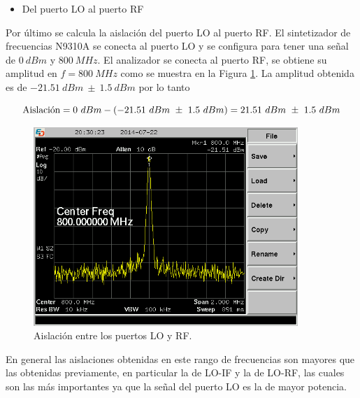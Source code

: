 \documentclass[a4paper,10pt]{article}
\begin{document}
	\begin{itemize}
		\item Del puerto LO al puerto RF
	\end{itemize}
	
	\indent Por \'ultimo se calcula la aislaci\'on del puerto LO al puerto RF. El sintetizador de frecuencias N9310A se conecta al puerto LO y se configura para tener una se\~nal de $0~dBm$ y $800~MHz$. El analizador se conecta al puerto RF, se obtiene su amplitud en $f=800~MHz$ como se muestra en la Figura \ref{isolation3fran}. La amplitud obtenida es de $-21.51~dBm~\pm~1.5~dBm$ por lo tanto
			
		$$\textmd{Aislaci\'on}=0~dBm-(-21.51~dBm~\pm~1.5~dBm)=21.51~dBm~\pm~1.5~dBm$$
	
	\begin{figure}[!htb]
		\centering
		\includegraphics[width=10cm]{Images/SCREN533.png}
		\caption{Aislaci\'on entre los puertos LO y RF.}
		\label{isolation3fran}
	\end{figure}	
	
	En general las aislaciones obtenidas en este rango de frecuencias son mayores que las obtenidas previamente, en particular la de LO-IF y la de LO-RF, las cuales son las m\'as importantes ya que la se\~nal del puerto LO es la de mayor potencia.
\end{document}
